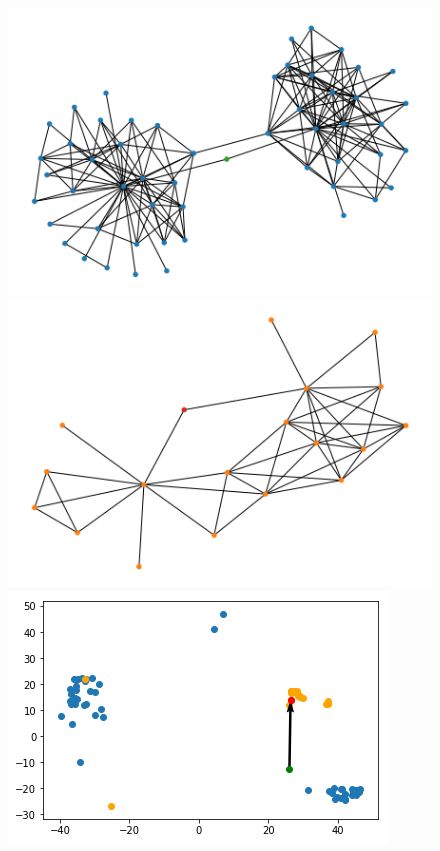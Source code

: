 \documentclass[12pt,twoside]{report}
\begin{document}
\begin{figure}[H]
\begin{center}
\begin{minipage}{0.45\linewidth}
\includegraphics[width=\linewidth]{figures/tsne_graph1.png}
\end{minipage}%
\hfill
\begin{minipage}{0.45\linewidth}
\includegraphics[width=\linewidth]{figures/tsne_graph2.png}
\end{minipage}
\hfill
\begin{minipage}{0.45\linewidth}
\includegraphics[width=\linewidth]{figures/tsne_trajectory2.png}

\end{minipage}
\end{center}
\end{figure}
\end{document}
